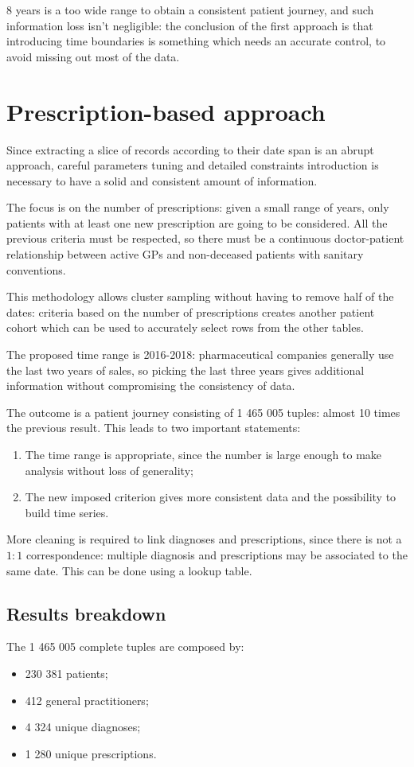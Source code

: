 8 years is a too wide range to obtain a consistent patient journey, and such information loss isn't negligible: the conclusion of the first approach is that introducing time boundaries is something which needs an accurate control, to avoid missing out most of the data.

\section{Prescription-based approach}
Since extracting a slice of records according to their date span is an abrupt approach, careful parameters tuning and detailed constraints introduction is necessary to have a solid and consistent amount of information.

The focus is on the number of prescriptions: given a small range of years, only patients with at least one new prescription are going to be considered. All the previous criteria must be respected, so there must be a continuous doctor-patient relationship between active GPs and non-deceased patients with sanitary conventions.

This methodology allows cluster sampling without having to remove half of the dates: criteria based on the number of prescriptions creates another patient cohort which can be used to accurately select rows from the other tables.

The proposed time range is 2016-2018: pharmaceutical companies generally use the last two years of sales, so picking the last three years gives additional information without compromising the consistency of data.

The outcome is a patient journey consisting of 1 465 005 tuples: almost 10 times the previous result. This leads to two important statements:
\begin{enumerate}
	\item The time range is appropriate, since the number is large enough to make analysis without loss of generality;
	\item The new imposed criterion gives more consistent data and the possibility to build time series.
\end{enumerate}

More cleaning is required to link diagnoses and prescriptions, since there is not a $1 : 1$ correspondence: multiple diagnosis and prescriptions may be associated to the same date. This can be done using a lookup table.

\subsection{Results breakdown}
The 1 465 005 complete tuples are composed by:
\begin{itemize}
	\item 230 381 patients;
	\item 412 general practitioners;
	\item 4 324 unique diagnoses;
	\item 1 280 unique prescriptions.
\end{itemize}


